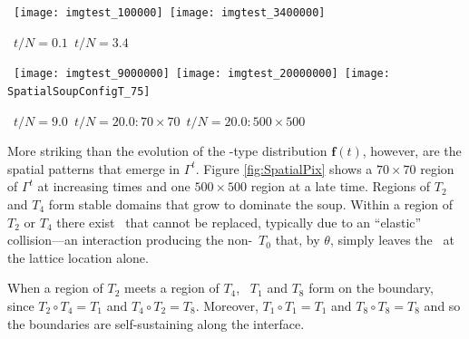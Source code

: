 \documentclass[pre,twocolumn,showpacs,superscriptaddress,preprintnumbers,floatfix]{revtex4}
\theoremstyle{plain}    \newtheorem{Lem}{Lemma}
\theoremstyle{plain}    \newtheorem*{ProLem}{Proof}
\theoremstyle{plain}    \newtheorem{Cor}{Corollary}
\theoremstyle{plain}    \newtheorem*{ProCor}{Proof}
\theoremstyle{plain}    \newtheorem{The}{Theorem}
\theoremstyle{plain}    \newtheorem*{ProThe}{Proof}
\theoremstyle{plain}    \newtheorem{Prop}{Proposition}
\theoremstyle{plain}    \newtheorem*{ProProp}{Proof}
\theoremstyle{plain}    \newtheorem*{Conj}{Conjecture}
\theoremstyle{plain}    \newtheorem*{Rem}{Remark}
\theoremstyle{plain}    \newtheorem{Def}{Definition}
\theoremstyle{plain}    \newtheorem*{Not}{Notation}
\newcommand{\PrEMType}{\mathbf{f}}
\begin{document}
\begin{figure*}[hbtp]
  \vspace{9pt}
  \centerline{\hbox{ \hspace{0.0in}
	\texttt{[image: imgtest\_100000]}
    \hspace{10pt}
	\texttt{[image: imgtest\_3400000]}
    }
  }
  \vspace{3pt}
  \hbox{\hspace{2.1in} $t/N=0.1$ \hspace{1.5in} $t/N=3.4$}
  \vspace{15pt}
  \centerline{\hbox{ \hspace{0.0in}
	\texttt{[image: imgtest\_9000000]}
    \hspace{10pt}
	\texttt{[image: imgtest\_20000000]}
    \hspace{10pt}
	\texttt{[image: SpatialSoupConfigT\_75]}
    }
  }
  \vspace{3pt}
  \hbox{\hspace{1.0in} $t/N=9.0$ \hspace{1.2in} $t/N=20.0: 70 \times 70$
  \hspace{0.7in} $t/N=20.0: 500 \times 500$}
  \vspace{7pt}
\caption{Emergent spatial replicators and their membranes: A $70 \times 70$
  region of $\Gamma$ with $n = 10^3$, $N=10^6$, and $c = v = 0$.
  The last image, however, is of a $500 \times 500$ region.
  Each color corresponds to one of the $16$ \eM\ types: $T_2$ is green,
  $T_4$ is dark gray, $T_1$ is yellow, $T_8$ is purple, and $T_{15}$
  is blue.
  }
\label{fig:SpatialPix}
\end{figure*}

More striking than the evolution of the \eM-type distribution $\PrEMType(t)$,
however, are the spatial patterns that emerge in $\Gamma^t$. Figure
\ref{fig:SpatialPix} shows a $70 \times 70$ region of $\Gamma^t$ at increasing
times and one $500 \times 500$ region at a late time. Regions of $T_2$ and
$T_4$ form stable domains that grow to dominate the soup. Within a region of
$T_2$ or $T_4$ there exist \eMs\ that cannot be replaced, typically due to
an ``elastic'' collision---an interaction producing the non-\eM\ $T_0$
that, by $\theta$, simply leaves the \eM\ at the lattice location alone.

When a region of $T_2$ meets a region of $T_4$, \eMs\ $T_1$ and $T_8$ form on
the boundary, since $T_2 \circ T_4 = T_1$ and $T_4 \circ T_2 = T_8$. Moreover,
$T_1 \circ T_1 = T_1$ and $T_8 \circ T_8 = T_8$ and so the boundaries are
self-sustaining along the interface.
\end{document}
